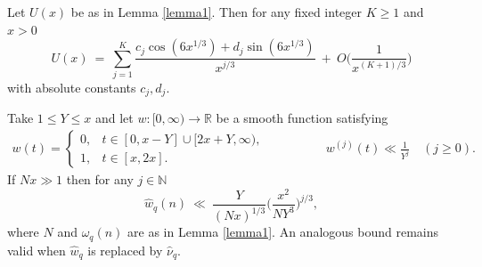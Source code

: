 \documentclass[10pt,a4paper]{amsart}
\begin{document}
\begin{lemma}\label{lemma4}
Let $U(x)$ be as in Lemma \ref{lemma1}. Then for any fixed integer $K\geq 1$ and $x >0$
\begin{equation*}
    U(x)\ =\ \sum_{j=1}^{K}\frac{c_j \cos(6x^{1/3})+d_j \sin{(6x^{1/3})}}{x^{j/3}}\ +\ O\Big(\frac{1}{x^{(K+1)/3}}\Big)
\end{equation*}
with absolute constants $c_j,d_j$.
\end{lemma}

\begin{lemma}\label{lemma5}
    Take $1\leq Y\leq x$ and let $w:[0,\infty)\to \mathbb{R}$ be a smooth function satisfying
    \begin{align*}
        w(t) = 
        \begin{cases} 
            0, & t \in [0, x-Y]\cup [2x+Y,\infty), \\ 
            1, & t \in [x, 2x]. 
        \end{cases} \hspace{2cm} w^{(j)}(t) \ll \frac{1}{Y^j} \quad (j \geq 0).
\end{align*}
If $Nx\gg 1$ then for any $j\in \mathbb{N}$
\begin{equation*}
    \hat{w}_q(n) \ \ll\ \frac{Y}{(Nx)^{1/3}} \Big( \frac{x^2}{NY^3}\Big)^{j/3},
\end{equation*}
where $N$ and $\hat{\omega}_q(n)$ are as in Lemma \ref{lemma1}. An analogous bound remains valid when $\hat{w}_q$ is replaced by $\hat{\nu}_q$.
\end{lemma}
\end{document}
